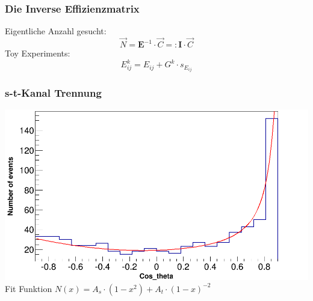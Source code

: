 \begingroup
\Large
\begin{frame}
	\frametitle{Die Inverse Effizienzmatrix}
	\hspace{2cm} Eigentliche Anzahl gesucht:
	\begin{equation*}
		\vec{N}=\boldsymbol{E}^{-1}\cdot\vec{C}=:\boldsymbol{I}\cdot\vec{C}
	\end{equation*}
	\hspace{2cm} Toy Experiments:
	\begin{equation*}
		E^{k}_{ij}=E_{ij}+G^k\cdot s_{E_{ij}}
	\end{equation*}
\end{frame}
\endgroup

\begin{frame}
	\frametitle{s-t-Kanal Trennung}
	\centering
	\includegraphics[width=0.85\linewidth]{../results/data_results/cosp_fits/stchannelexample46.png}
	\hspace{2cm} Fit Funktion $N(x)=A_s\cdot(1-x^2)+A_t\cdot(1-x)^{-2}$
\end{frame}


